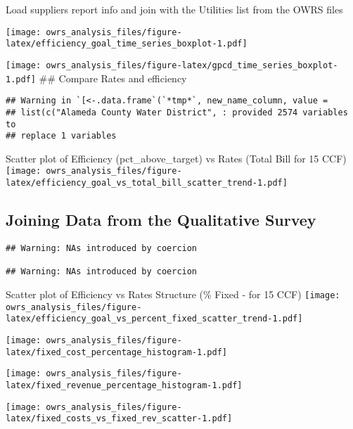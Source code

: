 \documentclass[]{article}
\begin{document}
Load suppliers report info and join with the Utilities list from the
OWRS files

\texttt{[image: owrs\_analysis\_files/figure-latex/efficiency\_goal\_time\_series\_boxplot-1.pdf]}

\texttt{[image: owrs\_analysis\_files/figure-latex/gpcd\_time\_series\_boxplot-1.pdf]}
\#\# Compare Rates and efficiency

\begin{verbatim}
## Warning in `[<-.data.frame`(`*tmp*`, new_name_column, value =
## list(c("Alameda County Water District", : provided 2574 variables to
## replace 1 variables
\end{verbatim}

Scatter plot of Efficiency (pct\_above\_target) vs Rates (Total Bill for
15 CCF)
\texttt{[image: owrs\_analysis\_files/figure-latex/efficiency\_goal\_vs\_total\_bill\_scatter\_trend-1.pdf]}

\subsection{Joining Data from the Qualitative
Survey}\label{joining-data-from-the-qualitative-survey}

\begin{verbatim}
## Warning: NAs introduced by coercion

## Warning: NAs introduced by coercion
\end{verbatim}

Scatter plot of Efficiency vs Rates Structure (\% Fixed - for 15 CCF)
\texttt{[image: owrs\_analysis\_files/figure-latex/efficiency\_goal\_vs\_percent\_fixed\_scatter\_trend-1.pdf]}

\texttt{[image: owrs\_analysis\_files/figure-latex/fixed\_cost\_percentage\_histogram-1.pdf]}

\texttt{[image: owrs\_analysis\_files/figure-latex/fixed\_revenue\_percentage\_histogram-1.pdf]}

\texttt{[image: owrs\_analysis\_files/figure-latex/fixed\_costs\_vs\_fixed\_rev\_scatter-1.pdf]}
\end{document}
